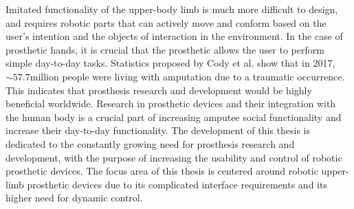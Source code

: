 \documentclass[../main.tex]{subfiles}
\begin{document}
Imitated functionality of the upper-body limb is much more difficult to design, and requires robotic parts that can actively move and conform based on the user's intention and the objects of interaction in the environment.  
In the case of prosthetic hands, it is crucial that the prosthetic allows the user to perform simple day-to-day tasks.
Statistics proposed by Cody et al. \cite{McDonald2020}  show that in 2017, $\sim 57.7 \text{million}$ people were living with amputation due to a \gls{traumatic} occurrence.
This indicates that prosthesis research and development would be highly beneficial worldwide.
Research in prosthetic devices and their integration with the human body is a crucial part of increasing amputee social functionality and increase their day-to-day functionality.
The development of this thesis is dedicated to the constantly growing need for prosthesis research and development, with the purpose of increasing the usability and control of robotic prosthetic devices.
The focus area of this thesis is centered around robotic upper-limb prosthetic devices due to its complicated interface requirements and its higher need for dynamic control.
\end{document}
